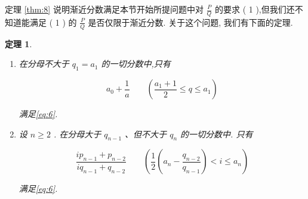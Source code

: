 \documentclass{ctexart}
\newtheorem{theorem}{\indent 定理}[section]
\begin{document}
定理 \ref{thm:8} 说明渐近分数满足本节开始所提问题中对 \(\frac{P}{Q}\) 的要求 ( 1 ),但我们还不知道能满足 ( 1 ) 的 \(\frac{P}{Q}\) 是否仅限于渐近分数. 关于这个问题, 我们有下面的定理.

\begin{theorem}
  \label{thm:9}
  \begin{enumerate}[label=\textup{(\roman*)}]
  \item\label{item:9.1} 在分母不大于 \({q}_{1} = {a}_{1}\) 的一切分数中,只有

\[
{a}_{0} + \frac{1}{a}\qquad\left( {\frac{{a}_{1} + 1}{2} \leq q \leq {a}_{1}}\right)
\]

满足\eqref{eq:6}.
\item\label{item:9.2} 设 \(n \geq 2\) . 在分母大于 \({q}_{n - 1}\) 、但不大于 \({q}_{n}\) 的一切分数中. 只有

\[
\frac{i{p}_{n - 1} + {p}_{n - 2}}{i{q}_{n - 1} + {q}_{n - 2}}\qquad\left( {\frac{1}{2}\left( {{a}_{n} - \frac{{q}_{n - 2}}{{q}_{n - 1}}}\right) < i \leq {a}_{n}}\right)
\]

满足\eqref{eq:6}.
  \end{enumerate}
\end{theorem}
\end{document}
